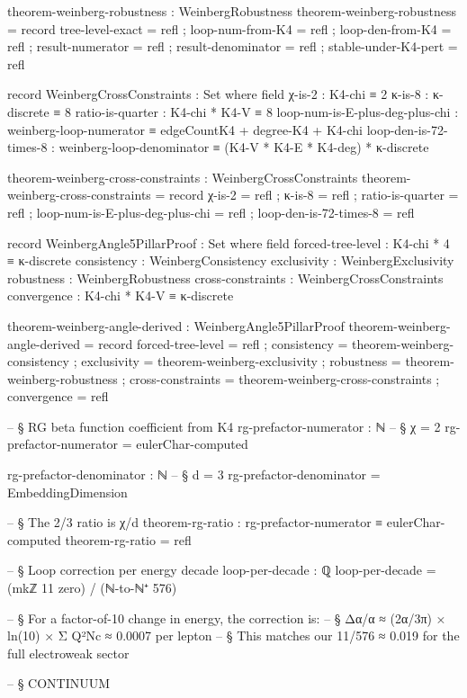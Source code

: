 \documentclass[11pt,a4paper]{book}
\begin{document}
\begin{code}
theorem-weinberg-robustness : WeinbergRobustness
theorem-weinberg-robustness = record
  { tree-level-exact = refl
  ; loop-num-from-K4 = refl
  ; loop-den-from-K4 = refl
  ; result-numerator = refl
  ; result-denominator = refl
  ; stable-under-K4-pert = refl
  }

record WeinbergCrossConstraints : Set where
  field
    χ-is-2 : K4-chi ≡ 2
    κ-is-8 : κ-discrete ≡ 8
    ratio-is-quarter : K4-chi * K4-V ≡ 8
    loop-num-is-E-plus-deg-plus-chi : weinberg-loop-numerator ≡ edgeCountK4 + degree-K4 + K4-chi
    loop-den-is-72-times-8 : weinberg-loop-denominator ≡ (K4-V * K4-E * K4-deg) * κ-discrete

theorem-weinberg-cross-constraints : WeinbergCrossConstraints
theorem-weinberg-cross-constraints = record
  { χ-is-2 = refl
  ; κ-is-8 = refl
  ; ratio-is-quarter = refl
  ; loop-num-is-E-plus-deg-plus-chi = refl
  ; loop-den-is-72-times-8 = refl
  }

record WeinbergAngle5PillarProof : Set where
  field
    forced-tree-level   : K4-chi * 4 ≡ κ-discrete
    consistency         : WeinbergConsistency
    exclusivity         : WeinbergExclusivity
    robustness          : WeinbergRobustness
    cross-constraints   : WeinbergCrossConstraints
    convergence         : K4-chi * K4-V ≡ κ-discrete

theorem-weinberg-angle-derived : WeinbergAngle5PillarProof
theorem-weinberg-angle-derived = record
  { forced-tree-level = refl
  ; consistency = theorem-weinberg-consistency
  ; exclusivity = theorem-weinberg-exclusivity
  ; robustness = theorem-weinberg-robustness
  ; cross-constraints = theorem-weinberg-cross-constraints
  ; convergence = refl
  }

-- § RG beta function coefficient from K4
rg-prefactor-numerator : ℕ
-- § χ = 2
rg-prefactor-numerator = eulerChar-computed

rg-prefactor-denominator : ℕ
-- § d = 3
rg-prefactor-denominator = EmbeddingDimension

-- § The 2/3 ratio is χ/d
theorem-rg-ratio : rg-prefactor-numerator ≡ eulerChar-computed
theorem-rg-ratio = refl

-- § Loop correction per energy decade
loop-per-decade : ℚ
loop-per-decade = (mkℤ 11 zero) / (ℕ-to-ℕ⁺ 576)

-- § For a factor-of-10 change in energy, the correction is:
-- § Δα/α ≈ (2α/3π) × ln(10) × Σ Q²Nc ≈ 0.0007 per lepton
-- § This matches our 11/576 ≈ 0.019 for the full electroweak sector


-- § CONTINUUM


\end{code}
\end{document}

